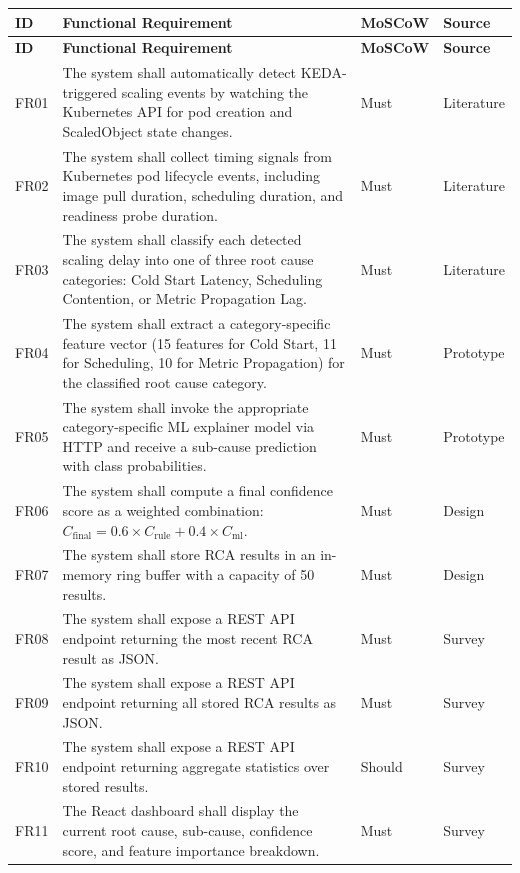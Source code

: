\begin{xltabular}{\textwidth}{|p{1.5cm}|X|p{2cm}|p{2cm}|}

\hline
\textbf{ID} & \textbf{Functional Requirement} & \textbf{MoSCoW} & \textbf{Source} \\ \hline
\endfirsthead

\hline
\textbf{ID} & \textbf{Functional Requirement} & \textbf{MoSCoW} & \textbf{Source} \\ \hline
\endhead

FR01 & The system shall automatically detect KEDA-triggered scaling events by watching the Kubernetes API for pod creation and ScaledObject state changes. & Must & Literature \\ \hline
FR02 & The system shall collect timing signals from Kubernetes pod lifecycle events, including image pull duration, scheduling duration, and readiness probe duration. & Must & Literature \\ \hline
FR03 & The system shall classify each detected scaling delay into one of three root cause categories: Cold Start Latency, Scheduling Contention, or Metric Propagation Lag. & Must & Literature \\ \hline
FR04 & The system shall extract a category-specific feature vector (15 features for Cold Start, 11 for Scheduling, 10 for Metric Propagation) for the classified root cause category. & Must & Prototype \\ \hline
FR05 & The system shall invoke the appropriate category-specific ML explainer model via HTTP and receive a sub-cause prediction with class probabilities. & Must & Prototype \\ \hline
FR06 & The system shall compute a final confidence score as a weighted combination: $C_{\text{final}} = 0.6 \times C_{\text{rule}} + 0.4 \times C_{\text{ml}}$. & Must & Design \\ \hline
FR07 & The system shall store RCA results in an in-memory ring buffer with a capacity of 50 results. & Must & Design \\ \hline
FR08 & The system shall expose a REST API endpoint returning the most recent RCA result as JSON. & Must & Survey \\ \hline
FR09 & The system shall expose a REST API endpoint returning all stored RCA results as JSON. & Must & Survey \\ \hline
FR10 & The system shall expose a REST API endpoint returning aggregate statistics over stored results. & Should & Survey \\ \hline
FR11 & The React dashboard shall display the current root cause, sub-cause, confidence score, and feature importance breakdown. & Must & Survey \\ \hline

\end{xltabular}
